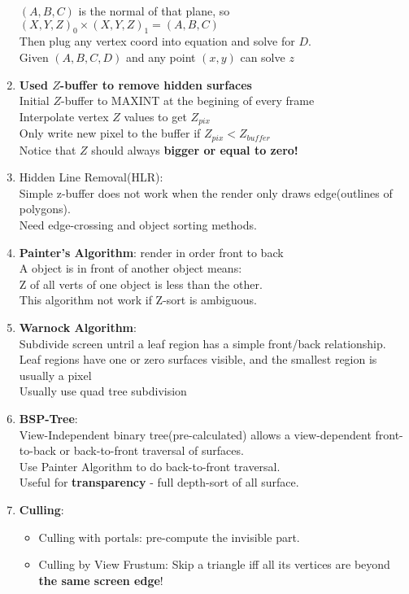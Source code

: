 \documentclass[geye,cyan,normal,en]{elegantnote}
\begin{document}
\begin{enumerate}
	$(A,B,C)$ is the normal of that plane, so $(X,Y,Z)_0 \times (X,Y,Z)_1 = (A,B,C)$\\
	Then plug any vertex coord into equation and solve for $D$.\\
	Given $(A,B,C,D)$ and any point $(x,y)$ can solve $z$
	\item \textbf{Used $Z$-buffer to remove hidden surfaces}\\
	Initial $Z$-buffer to MAXINT at the begining of every frame\\
	Interpolate vertex $Z$ values to get $Z_{pix}$\\
	Only write new pixel to the buffer if $Z_{pix}<Z_{buffer}$\\
	Notice that $Z$ should always \textbf{bigger or equal to zero!}
	\item Hidden Line Removal(HLR):\\
	Simple z-buffer does not work when the render only draws edge(outlines of polygons).\\
	Need edge-crossing and object sorting methods.
	\item \textbf{Painter's Algorithm}: render in order front to back\\
	A object is in front of another object means:\\
	Z of all verts of one object is less than the other.\\
	This algorithm not work if Z-sort is ambiguous.
	\item \textbf{Warnock Algorithm}:\\
	Subdivide screen untril a leaf region has a simple front/back relationship.\\
	Leaf regions have one or zero surfaces visible, and the smallest region is usually a pixel\\
	Usually use quad tree subdivision
	\item \textbf{BSP-Tree}:\\
	View-Independent binary tree(pre-calculated) allows a view-dependent front-to-back or back-to-front traversal of surfaces.\\
	Use Painter Algorithm to do back-to-front traversal.\\
	Useful for \textbf{transparency} - full depth-sort of all surface.
	\item \textbf{Culling}:
	\begin{itemize}
		\item Culling with portals: pre-compute the invisible part.
		\item Culling by View Frustum: Skip a triangle iff all its vertices are beyond \textbf{the same screen edge}!\\

\end{itemize}
\end{enumerate}
\end{document}
